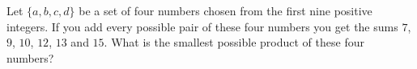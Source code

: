 Let $\{a,b,c,d\}$ be a set of four numbers chosen from the first nine positive integers. If you add every possible pair of these four numbers you get the sums $7$, $9$, $10$, $12$, $13$ and $15$. What is the smallest possible product of these four numbers?
